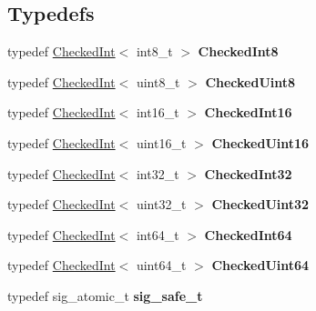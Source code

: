 \subsection*{Typedefs}
\begin{DoxyCompactItemize}
\item 
\hypertarget{namespacemozilla_a8fdfe8a59f6772da995013ad243d786f}{typedef \hyperlink{classmozilla_1_1_checked_int}{Checked\-Int}$<$ int8\-\_\-t $>$ {\bfseries Checked\-Int8}}\label{namespacemozilla_a8fdfe8a59f6772da995013ad243d786f}

\item 
\hypertarget{namespacemozilla_ab68a644a82b3770fde15303e0b6e0101}{typedef \hyperlink{classmozilla_1_1_checked_int}{Checked\-Int}$<$ uint8\-\_\-t $>$ {\bfseries Checked\-Uint8}}\label{namespacemozilla_ab68a644a82b3770fde15303e0b6e0101}

\item 
\hypertarget{namespacemozilla_a80ec60f81590b954a0a1f6f92520cb00}{typedef \hyperlink{classmozilla_1_1_checked_int}{Checked\-Int}$<$ int16\-\_\-t $>$ {\bfseries Checked\-Int16}}\label{namespacemozilla_a80ec60f81590b954a0a1f6f92520cb00}

\item 
\hypertarget{namespacemozilla_a86d46a5a2113b4051a07498036bdcd95}{typedef \hyperlink{classmozilla_1_1_checked_int}{Checked\-Int}$<$ uint16\-\_\-t $>$ {\bfseries Checked\-Uint16}}\label{namespacemozilla_a86d46a5a2113b4051a07498036bdcd95}

\item 
\hypertarget{namespacemozilla_a9fe6958baa07767b22979ea983c91fc1}{typedef \hyperlink{classmozilla_1_1_checked_int}{Checked\-Int}$<$ int32\-\_\-t $>$ {\bfseries Checked\-Int32}}\label{namespacemozilla_a9fe6958baa07767b22979ea983c91fc1}

\item 
\hypertarget{namespacemozilla_a363535f24ef153094f4337a00d141c16}{typedef \hyperlink{classmozilla_1_1_checked_int}{Checked\-Int}$<$ uint32\-\_\-t $>$ {\bfseries Checked\-Uint32}}\label{namespacemozilla_a363535f24ef153094f4337a00d141c16}

\item 
\hypertarget{namespacemozilla_af48679e641d56e66adae0ba532b6e76f}{typedef \hyperlink{classmozilla_1_1_checked_int}{Checked\-Int}$<$ int64\-\_\-t $>$ {\bfseries Checked\-Int64}}\label{namespacemozilla_af48679e641d56e66adae0ba532b6e76f}

\item 
\hypertarget{namespacemozilla_aa949fd8ce92c89e0c1eb3856821b3289}{typedef \hyperlink{classmozilla_1_1_checked_int}{Checked\-Int}$<$ uint64\-\_\-t $>$ {\bfseries Checked\-Uint64}}\label{namespacemozilla_aa949fd8ce92c89e0c1eb3856821b3289}

\item 
\hypertarget{namespacemozilla_a17bbea4c156c300fe73caa2cde806c45}{typedef sig\-\_\-atomic\-\_\-t {\bfseries sig\-\_\-safe\-\_\-t}}\label{namespacemozilla_a17bbea4c156c300fe73caa2cde806c45}

\end{DoxyCompactItemize}
